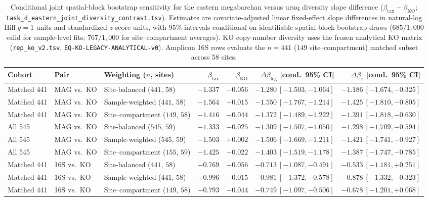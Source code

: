 \begin{table}[htbp]\centering\scriptsize
\setlength{\tabcolsep}{2pt}
\caption{Conditional joint spatial-block bootstrap sensitivity for the eastern megabarchan versus uruq diversity slope difference ($\beta_{\mathrm{tax}} - \beta_{\mathrm{KO}}$; \texttt{task\_\allowbreak d\_\allowbreak eastern\_\allowbreak joint\_\allowbreak diversity\_\allowbreak contrast.tsv}). Estimates are covariate-adjusted linear fixed-effect slope differences in natural-log Hill $q=1$ units and standardized $z$-score units, with 95\% intervals conditional on identifiable spatial-block bootstrap draws ($685/1{,}000$ valid for sample-level fits; $767/1{,}000$ for site--compartment averages). KO copy-number diversity uses the frozen analytical KO matrix (\texttt{rep\_\allowbreak ko\_\allowbreak v2.tsv}, \texttt{EQ-\allowbreak KO-\allowbreak LEGACY-\allowbreak ANALYTICAL-\allowbreak v0}). Amplicon 16S rows evaluate the $n=441$ ($149$ site--compartment) matched subset across 58 sites.}\label{tab:stage4_joint_diversity}
\begin{tabular}{>{\raggedright\arraybackslash}p{1.6cm}llrrrr}\toprule
Cohort & Pair & Weighting ($n$, sites) & $\beta_{\mathrm{tax}}$ & $\beta_{\mathrm{KO}}$ & $\Delta\beta_{\mathrm{log}}$ [cond.\ 95\% CI] & $\Delta\beta_{z}$ [cond.\ 95\% CI]\\\midrule
Matched 441 & MAG vs.\ KO & Site-balanced ($441$, $58$) & $-1.337$ & $-0.056$ & $-1.280\ [-1.503,-1.064]$ & $-1.186\ [-1.674,-0.325]$\\
Matched 441 & MAG vs.\ KO & Sample-weighted ($441$, $58$) & $-1.564$ & $-0.015$ & $-1.550\ [-1.767,-1.214]$ & $-1.425\ [-1.810,-0.805]$\\
Matched 441 & MAG vs.\ KO & Site--compartment ($149$, $58$) & $-1.416$ & $-0.044$ & $-1.372\ [-1.489,-1.222]$ & $-1.391\ [-1.818,-0.630]$\\
All 545 & MAG vs.\ KO & Site-balanced ($545$, $59$) & $-1.333$ & $-0.025$ & $-1.309\ [-1.507,-1.050]$ & $-1.298\ [-1.709,-0.594]$\\
All 545 & MAG vs.\ KO & Sample-weighted ($545$, $59$) & $-1.503$ & $+0.002$ & $-1.506\ [-1.669,-1.211]$ & $-1.421\ [-1.741,-0.927]$\\
All 545 & MAG vs.\ KO & Site--compartment ($155$, $59$) & $-1.425$ & $-0.022$ & $-1.403\ [-1.519,-1.178]$ & $-1.387\ [-1.747,-0.785]$\\
Matched 441 & 16S vs.\ KO & Site-balanced ($441$, $58$) & $-0.769$ & $-0.056$ & $-0.713\ [-1.087,-0.491]$ & $-0.533\ [-1.181,+0.251]$\\
Matched 441 & 16S vs.\ KO & Sample-weighted ($441$, $58$) & $-0.996$ & $-0.015$ & $-0.981\ [-1.372,-0.578]$ & $-0.878\ [-1.332,-0.323]$\\
Matched 441 & 16S vs.\ KO & Site--compartment ($149$, $58$) & $-0.793$ & $-0.044$ & $-0.749\ [-1.097,-0.506]$ & $-0.678\ [-1.201,+0.068]$\\\bottomrule
\end{tabular}
\end{table}


